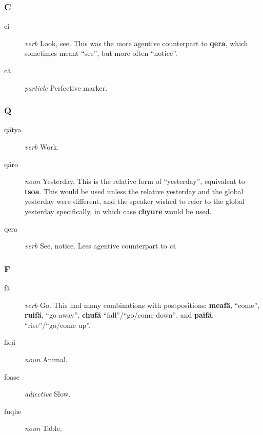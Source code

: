 \documentclass{article}
\begin{document}
\subsubsection{C}

\begin{description}
\item [ci] \emph{verb} Look, see.  This was the more agentive counterpart to \textbf{qera}, which sometimes meant ``see'', but more often ``notice''.
\end{description}

\begin{description}
\item [c\"a] \emph{particle} Perfective marker.
\end{description}

\subsubsection{Q}

\begin{description}
\item [q\"atya] \emph{verb} Work.
\item [q\"aro] \emph{noun} Yesterday.  This is the relative form of ``yesterday'', equivalent to \textbf{tsoa}.  This would be used unless the relative yesterday and the global yesterday were different, and the speaker wished to refer to the global yesterday specifically, in which case \textbf{chyure} would be used.
\item [qera] \emph{verb} See, notice.  Less agentive counterpart to \emph{ci}.
\end{description}

\subsubsection{F}

\begin{description}
\item [f\"a] \emph{verb} Go.  This had many combinations with postpositions: \textbf{meaf\"a}, ``come'', \textbf{ruif\"a}, ``go away'', \textbf{chuf\"a} ``fall''/``go/come down'', and \textbf{paif\"a}, ``rise''/``go/come up''.
\item [fiq\"a] \emph{noun} Animal.
\item [foase] \emph{adjective} Slow.
\item [fuqhe] \emph{noun} Table.
\end{description}
\end{document}
